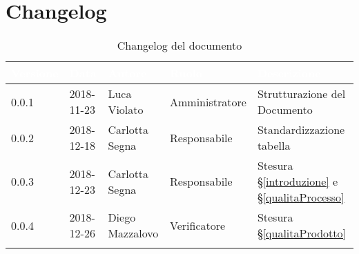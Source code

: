 \section{Changelog}

\begin{center}
\begin{longtable}[c]{|m{}|m{}|m{}|m{}|p{}|}
\hline
\rowcolor{bluelogo}\textbf{\textcolor{white}{Versione}} & \textbf{\textcolor{white}{Data}} & \textbf{\textcolor{white}{Autore}} & \textbf{\textcolor{white}{Ruolo}} & \textbf{\textcolor{white}{Descrizione}}\\
\hline \hline
\endfirsthead
0.0.1 & 2018-11-23 & Luca Violato & Amministratore & Strutturazione del Documento \\
\hline
\rowcolor{grigio} 0.0.2 & 2018-12-18 & Carlotta Segna & Responsabile & Standardizzazione tabella \\
\hline
0.0.3 & 2018-12-23 & Carlotta Segna & Responsabile & Stesura §\ref{introduzione} e §\ref{qualitaProcesso} \\
\hline
\rowcolor{grigio} 0.0.4 & 2018-12-26 & Diego Mazzalovo & Verificatore & Stesura §\ref{qualitaProdotto} \\
\hline
\caption{Changelog del documento}
\end{longtable}
\end{center}